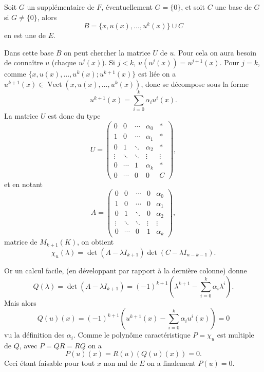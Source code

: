 Soit $G$ un supplémentaire de $F$, éventuellement $G=\{0\}$, et soit $C$ une base de $G$ si $G\ne\{0\}$, alors
\[
B=\{x,u(x),\ldots,u^k(x)\}\cup C
\]
en est une de $E$.

Dans cette base $B$ on peut chercher la matrice $U$ de $u$. Pour cela on aura besoin de connaître $u$ (chaque $u^j(x)$). Si $j<k$, $u(u^j(x))=u^{j+1}(x)$. Pour $j=k$, comme $\{x,u(x),\ldots,u^k(x);u^{k+1}(x)\}$ est liée on a $u^{k+1}(x)\in\operatorname{Vect}(x,u(x),\ldots,u^k(x))$, donc se décompose sous la forme
\[
u^{k+1}(x)=\sum_{i=0}^k\alpha_i u^i(x).
\]
La matrice $U$ est donc du type
\[
U=\left(
\begin{array}{cccc|c}
0&0&\cdots&\alpha_0&\ast\\
1&0&\cdots&\alpha_1&\ast\\
0&1&\ddots&\alpha_2&\ast\\
\vdots&\ddots&\ddots&\vdots&\vdots\\
0&\cdots&1&\alpha_k&\ast\\ \hline
0&\cdots&0&0&C
\end{array}\right),
\]
et en notant
\[
A=\begin{pmatrix}
0&0&\cdots&0&\alpha_0\\
1&0&\cdots&0&\alpha_1\\
0&1&\ddots&0&\alpha_2\\
\vdots&\ddots&\ddots&\vdots&\vdots\\
0&\cdots&0&1&\alpha_k
\end{pmatrix},
\]
matrice de $M_{k+1}(K)$, on obtient
\[
\chi_u(\lambda)=\det(A-\lambda I_{k+1})\det(C-\lambda I_{n-k-1}).
\]

Or un calcul facile, (en développant par rapport à la dernière colonne) donne
\[
Q(\lambda)=\det(A-\lambda I_{k+1})
=(-1)^{k+1}\left(\lambda^{k+1}-\sum_{i=0}^k\alpha_i\lambda^i\right).
\]
Mais alors
\[
Q(u)(x)=(-1)^{k+1}\left(u^{k+1}(x)-\sum_{i=0}^k\alpha_i u^i(x)\right)=0
\]
vu la définition des $\alpha_i$. Comme le polynôme caractéristique $P=\chi_u$ est multiple de $Q$, avec $P=QR=RQ$ on a
\[
P(u)(x)=R(u)(Q(u)(x))=0.
\]
Ceci étant faisable pour tout $x$ non nul de $E$ on a finalement $P(u)=0$. \bookend

